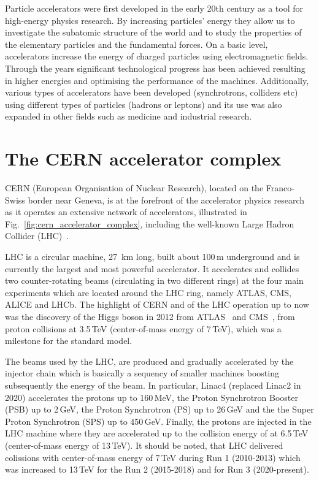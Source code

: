 Particle accelerators were first developed in the early 20th century as a tool for high-energy physics research. By increasing particles' energy they allow us to investigate the subatomic structure of the world and to study the properties of the elementary particles and the fundamental forces. On a basic level, accelerators increase the energy of charged particles using electromagnetic fields. Through the years significant technological progress has been achieved resulting in higher energies and optimising the performance of the machines. Additionally, various types of accelerators have been developed (synchrotrons, colliders etc) using different types of particles (hadrons or leptons) and its use was also expanded in other fields such as medicine and industrial research. 



\section{The CERN accelerator complex}

CERN (European Organisation of Nuclear Research), located on the Franco-Swiss border near Geneva, is at the forefront of the accelerator physics research as it operates an extensive network of accelerators, illustrated in Fig.~\ref{fig:cern_accelerator_complex}, including the well-known Large Hadron Collider (LHC)~\cite{Brüning:782076}.

LHC is a circular machine, 27\, km long, built about 100\,m underground and is currently the largest and most powerful accelerator. It accelerates and collides two counter-rotating beams (circulating in two different rings) at the four main experiments which are located around the LHC ring, namely ATLAS, CMS, ALICE and LHCb. The highlight of CERN and of the LHC operation up to now was the discovery of the Higgs boson in 2012 from ATLAS~\cite{ATLAS_Higgs} and CMS~\cite{CMS_Higgs}, from proton collisions at 3.5\,TeV (center-of-mass energy of 7\,TeV), which was a milestone for the standard model. %

The beams used by the LHC, are produced and gradually accelerated by the injector chain which is basically a sequency of smaller machines boosting subsequently the energy of the beam. In particular, Linac4 (replaced Linac2 in 2020) accelerates the protons up to 160\,MeV, the Proton Synchrotron Booster (PSB) up to 2\,GeV, the Proton Synchrotron (PS) up to 26\,GeV and the the Super Proton Synchrotron (SPS) up to 450\,GeV. Finally, the protons are injected in the LHC machine where they are accelerated up to the collision energy of at 6.5\,TeV (center-of-mass energy of 13\,TeV). It should be noted, that LHC delivered colissions with center-of-mass energy of 7\,TeV during Run 1 (2010-2013) which was increased to 13\,TeV for the Run 2 (2015-2018) and for Run 3 (2020-present). 

